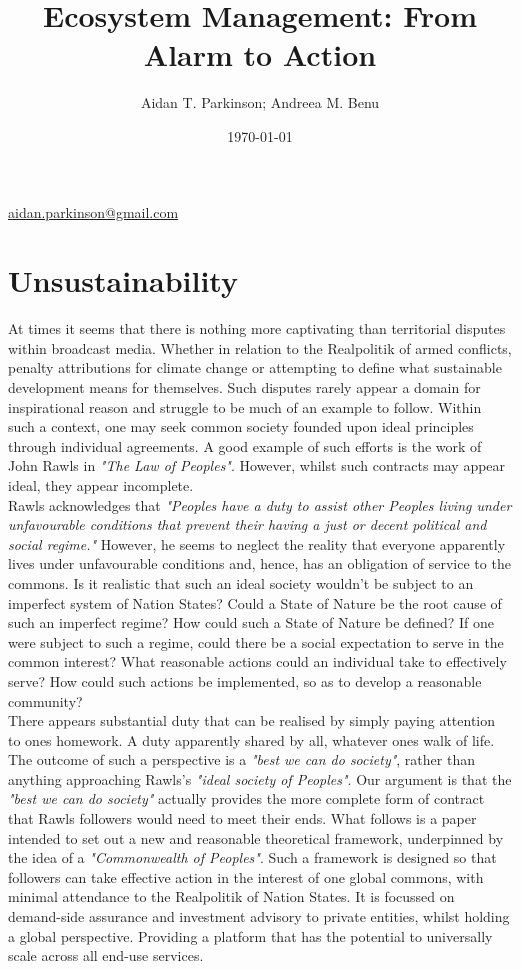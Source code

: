 \documentclass[11pt, oneside]{article}   	%
\title{Ecosystem Management: From Alarm to Action}
\author{Aidan T. Parkinson; Andreea M. Benu}
\date{\today}							%
\begin{document}
\maketitle
\begin{center}
\href{mailto:aidan.parkinson@gmail.com}{aidan.parkinson@gmail.com}
\end{center}

\section{Unsustainability}

At times it seems that there is nothing more captivating than territorial disputes within broadcast media.
Whether in relation to the Realpolitik of armed conflicts, penalty attributions for climate change or attempting to define what sustainable development means for themselves.
Such disputes rarely appear a domain for inspirational reason and struggle to be much of an example to follow.
Within such a context, one may seek common society founded upon ideal principles through individual agreements.
A good example of such efforts is the work of John Rawls in \emph{"The Law of Peoples"}.
However, whilst such contracts may appear ideal, they appear incomplete.\\

Rawls acknowledges that \emph{"Peoples have a duty to assist other Peoples living under unfavourable conditions that prevent their having a just or decent political and social regime."}
However, he seems to neglect the reality that everyone apparently lives under unfavourable conditions and, hence, has an obligation of service to the commons.
Is it realistic that such an ideal society wouldn't be subject to an imperfect system of Nation States?
Could a State of Nature be the root cause of such an imperfect regime?
How could such a State of Nature be defined?
If one were subject to such a regime, could there be a social expectation to serve in the common interest?
What reasonable actions could an individual take to effectively serve?
How could such actions be implemented, so as to develop a reasonable community?\\

There appears substantial duty that can be realised by simply paying attention to ones homework.
A duty apparently shared by all, whatever ones walk of life.
The outcome of such a perspective is a \emph{"best we can do society"}, rather than anything approaching Rawls's \emph{"ideal society of Peoples"}.
Our argument is that the \emph{"best we can do society"} actually provides the more complete form of contract that Rawls followers would need to meet their ends.
What follows is a paper intended to set out a new and reasonable theoretical framework, underpinned by the idea of a \emph{"Commonwealth of Peoples"}.
Such a framework is designed so that followers can take effective action in the interest of one global commons, with minimal attendance to the Realpolitik of Nation States.
It is focussed on demand-side assurance and investment advisory to private entities, whilst holding a global perspective.
Providing a platform that has the potential to universally scale across all end-use services.\\
\end{document}
